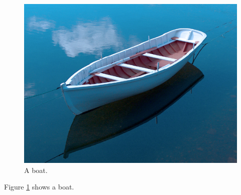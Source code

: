 \documentclass{article}
\begin{document}
\begin{figure}
  \includegraphics[width=\linewidth]{boat.jpg}
  \caption{A boat.}
  \label{fig:boat1}
\end{figure}

Figure \ref{fig:boat1} shows a boat.
\end{document}
